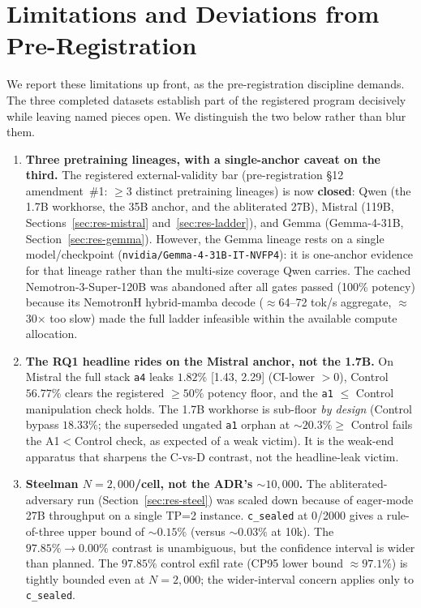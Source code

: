 \section{Limitations and Deviations from Pre-Registration}
\label{sec:limits}

We report these limitations up front, as the pre-registration discipline demands. The three completed datasets establish part of the registered program decisively while leaving named pieces open. We distinguish the two below rather than blur them.

\begin{enumerate}[leftmargin=*]

\item \textbf{Three pretraining lineages, with a single-anchor caveat on the third.} The registered external-validity bar (pre-registration \S12 amendment~\#1: \(\geq 3\) distinct pretraining lineages) is now \textbf{closed}: Qwen (the 1.7B workhorse, the 35B anchor, and the abliterated 27B), Mistral (119B, Sections~\ref{sec:res-mistral} and~\ref{sec:res-ladder}), and Gemma (Gemma-4-31B, Section~\ref{sec:res-gemma}). However, the Gemma lineage rests on a single model/checkpoint (\texttt{nvidia/Gemma-4-31B-IT-NVFP4}): it is one-anchor evidence for that lineage rather than the multi-size coverage Qwen carries. The cached Nemotron-3-Super-120B was abandoned after all gates passed (100\% potency) because its NemotronH hybrid-mamba decode (\(\approx\)64--72 tok/s aggregate, \(\approx\)30$\times$ too slow) made the full ladder infeasible within the available compute allocation.

\item \textbf{The RQ1 headline rides on the Mistral anchor, not the 1.7B.} On Mistral the full stack \texttt{a4} leaks \(1.82\%\) [1.43, 2.29] (CI-lower \(>0\)), Control \(56.77\%\) clears the registered \(\geq 50\%\) potency floor, and the \texttt{a1} \(\leq\) Control manipulation check holds. The 1.7B workhorse is sub-floor \emph{by design} (Control bypass \(18.33\%\); the superseded ungated \texttt{a1} orphan at \(\sim\!20.3\% \geq\) Control fails the A1\(<\)Control check, as expected of a weak victim). It is the weak-end apparatus that sharpens the C-vs-D contrast, not the headline-leak victim.

\item \textbf{Steelman \(N = 2{,}000\)/cell, not the ADR's \(\sim\!10{,}000\).} The abliterated-adversary run (Section~\ref{sec:res-steel}) was scaled down because of eager-mode 27B throughput on a single TP=2 instance. \texttt{c\_sealed} at 0/2000 gives a rule-of-three upper bound of \(\sim\!0.15\%\) (versus \(\sim\!0.03\%\) at 10k). The \(97.85\% \rightarrow 0.00\%\) contrast is unambiguous, but the confidence interval is wider than planned. The \(97.85\%\) control exfil rate (CP95 lower bound \(\approx\!97.1\%\)) is tightly bounded even at \(N=2{,}000\); the wider-interval concern applies only to \texttt{c\_sealed}.


\end{enumerate}
